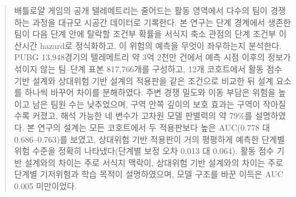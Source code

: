 \begin{abstract}
배틀로얄 게임의 공개 텔레메트리는 줄어드는 활동 영역에서 다수의 팀이 경쟁하는 과정을 대규모 시공간 데이터로 기록한다.
본 연구는 단계 경계에서 생존한 팀이 다음 단계 안에 탈락할 조건부 확률을 서식지 축소 관점의 단계 조건부 이산시간 hazard로 정식화하고, 이 위험의 예측을 무엇이 좌우하는지 분석한다.
PUBG 13,948경기의 텔레메트리 약 3억 2천만 건에서 예측 시점 이후의 정보가 섞이지 않는 팀--단계 표본 817,766개를 구성하고, 12개 코호트에서 활동 점수 기반 설계와 상대위험 기반 설계의 적용판을 같은 조건으로 비교한 뒤 설계 요소를 하나씩 바꾸어 차이를 분해하였다.
주변 경쟁 밀도와 이동 부담은 위험을 높이고 남은 팀원 수는 낮추었으며, 구역 안쪽 깊이의 보호 효과는 구역이 작아질수록 커졌고, 해석 가능한 네 변수가 고차원 모델 판별력의 약 79\%를 설명하였다.
본 연구의 설계는 모든 코호트에서 두 적용판보다 높은 AUC(0.778 대 0.686--0.763)를 보였고, 상대위험 기반 적용판이 거의 평평하게 예측한 단계별 위험 수준을 정확히 나타냈다(단계별 보정 오차 0.013 대 0.064).
활동 점수 기반 설계와의 차이는 주로 서식지 맥락이, 상대위험 기반 설계와의 차이는 주로 단계별 기저위험과 학습 목적이 설명하였으며, 모델 구조를 바꾼 이득은 AUC 0.005 미만이었다.
\end{abstract}

